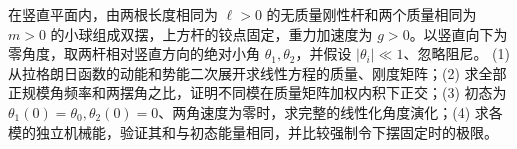 在竖直平面内，由两根长度相同为 \(\ell>0\) 的无质量刚性杆和两个质量相同为 \(m>0\) 的小球组成双摆，上方杆的铰点固定，重力加速度为 \(g>0\)。以竖直向下为零角度，取两杆相对竖直方向的绝对小角 \(\theta_1,\theta_2\)，并假设 \(|\theta_i|\ll1\)、忽略阻尼。
(1) 从拉格朗日函数的动能和势能二次展开求线性方程的质量、刚度矩阵；(2) 求全部正规模角频率和两摆角之比，证明不同模在质量矩阵加权内积下正交；(3) 初态为 \(\theta_1(0)=\theta_0,\theta_2(0)=0\)、两角速度为零时，求完整的线性化角度演化；(4) 求各模的独立机械能，验证其和与初态能量相同，并比较强制令下摆固定时的极限。
